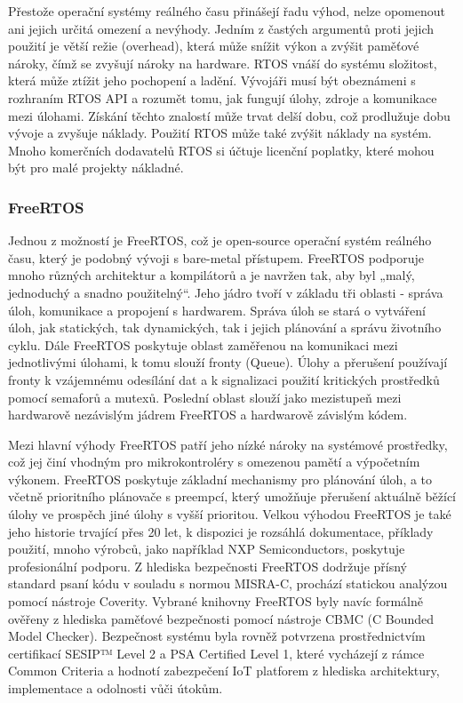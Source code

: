 Přestože operační systémy reálného času přinášejí řadu výhod, nelze opomenout ani jejich určitá omezení a nevýhody. Jedním z častých argumentů proti jejich použití je větší režie (overhead), která může snížit výkon a zvýšit paměťové nároky, čímž se zvyšují nároky na hardware. RTOS vnáší do systému složitost, která může ztížit jeho pochopení a ladění. Vývojáři musí být obeznámeni s rozhraním RTOS API a rozumět tomu, jak fungují úlohy, zdroje a komunikace mezi úlohami. Získání těchto znalostí může trvat delší dobu, což prodlužuje dobu vývoje a zvyšuje náklady. Použití RTOS může také zvýšit náklady na systém. Mnoho komerčních dodavatelů RTOS si účtuje licenční poplatky, které mohou být pro malé projekty nákladné.

\subsubsection{FreeRTOS}
Jednou z možností je FreeRTOS, což je open-source operační systém reálného času, který je podobný vývoji s bare-metal přístupem. FreeRTOS podporuje mnoho různých architektur a kompilátorů a je navržen tak, aby byl „malý, jednoduchý a snadno použitelný“. Jeho jádro tvoří v základu tři oblasti - správa úloh, komunikace a propojení s hardwarem. Správa úloh se stará o vytváření úloh, jak statických, tak dynamických, tak i jejich plánování a správu životního cyklu. Dále FreeRTOS poskytuje oblast zaměřenou na komunikaci mezi jednotlivými úlohami, k tomu slouží fronty (Queue). Úlohy a přerušení používají fronty k vzájemnému odesílání dat a k signalizaci použití kritických prostředků pomocí semaforů a mutexů. Poslední oblast slouží jako mezistupeň mezi hardwarově nezávislým jádrem FreeRTOS a hardwarově závislým kódem.

Mezi hlavní výhody FreeRTOS patří jeho nízké nároky na systémové prostředky, což jej činí vhodným pro mikrokontroléry s omezenou pamětí a výpočetním výkonem. FreeRTOS poskytuje základní mechanismy pro plánování úloh, a to včetně prioritního plánovače s preempcí, který umožňuje přerušení aktuálně běžící úlohy ve prospěch jiné úlohy s vyšší prioritou. Velkou výhodou FreeRTOS je také jeho historie trvající přes 20 let, k dispozici je rozsáhlá dokumentace, příklady použití, mnoho výrobců, jako například NXP Semiconductors, poskytuje profesionální podporu. Z hlediska bezpečnosti FreeRTOS dodržuje přísný standard psaní kódu v souladu s normou MISRA-C, prochází statickou analýzou pomocí nástroje Coverity. Vybrané knihovny FreeRTOS byly navíc formálně ověřeny z hlediska paměťové bezpečnosti pomocí nástroje CBMC (C Bounded Model Checker). Bezpečnost systému byla rovněž potvrzena prostřednictvím certifikací SESIP™ Level 2 a PSA Certified Level 1, které vycházejí z rámce Common Criteria a hodnotí zabezpečení IoT platforem z hlediska architektury, implementace a odolnosti vůči útokům. \cite{freertos_security}

